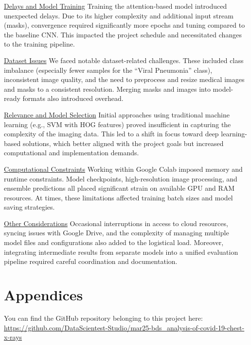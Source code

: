 \documentclass{article}
\begin{document}
\underline{Delays and Model Training}
Training the attention-based model introduced unexpected delays. Due to its higher complexity and additional input stream (masks), convergence required significantly more epochs and tuning compared to the baseline CNN. This impacted the project schedule and necessitated changes to the training pipeline.

\underline{Dataset Issues}
We faced notable dataset-related challenges. These included class imbalance (especially fewer samples for the “Viral Pneumonia” class), inconsistent image quality, and the need to preprocess and resize medical images and masks to a consistent resolution. Merging masks and images into model-ready formats also introduced overhead.

\underline{Relevance and Model Selection}
Initial approaches using traditional machine learning (e.g., SVM with HOG features) proved insufficient in capturing the complexity of the imaging data. This led to a shift in focus toward deep learning-based solutions, which better aligned with the project goals but increased computational and implementation demands.

\underline{Computational Constraints}
Working within Google Colab imposed memory and runtime constraints. Model checkpoints, high-resolution image processing, and ensemble predictions all placed significant strain on available GPU and RAM resources. At times, these limitations affected training batch sizes and model saving strategies.

\underline{Other Considerations}
Occasional interruptions in access to cloud resources, syncing issues with Google Drive, and the complexity of managing multiple model files and configurations also added to the logistical load. Moreover, integrating intermediate results from separate models into a unified evaluation pipeline required careful coordination and documentation.


\section{Appendices}

You can find the GitHub repository belonging to this project here: \\
\url{https://github.com/DataScientest-Studio/mar25-bds_analysis-of-covid-19-chest-x-rays}\\



\end{document}
